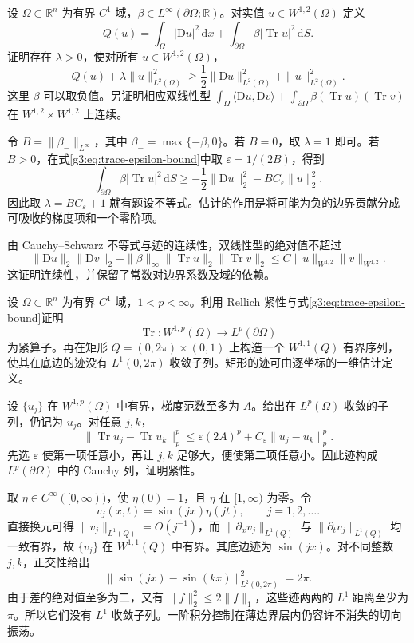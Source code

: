 \begin{exercise}\label{g3:ex:boundary-energy-lower-bound}
	设 \(\Omega\subset\mathbb R^n\) 为有界 \(C^1\) 域，\(\beta\in L^\infty(\partial\Omega;\mathbb R)\)。对实值 \(u\in W^{1,2}(\Omega)\) 定义
	\[
		Q(u)=\int_\Omega|\mathrm Du|^2\,\mathrm dx
		+\int_{\partial\Omega}\beta|\operatorname{Tr}u|^2\,\mathrm dS.
	\]
	证明存在 \(\lambda>0\)，使对所有 \(u\in W^{1,2}(\Omega)\)，
	\[
		Q(u)+\lambda\|u\|_{L^2(\Omega)}^2
		\ge\frac12\|\mathrm Du\|_{L^2(\Omega)}^2
		+\|u\|_{L^2(\Omega)}^2.
	\]
	这里 \(\beta\) 可以取负值。另证明相应双线性型
	\(\int_\Omega\langle\mathrm Du,\mathrm Dv\rangle+\int_{\partial\Omega}\beta(\operatorname{Tr}u)(\operatorname{Tr}v)\)
	在 \(W^{1,2}\times W^{1,2}\) 上连续。
\end{exercise}
\begin{solution}
	令 \(B=\|\beta_-\|_{L^\infty}\)，其中 \(\beta_-=\max\{-\beta,0\}\)。若 \(B=0\)，取 \(\lambda=1\) 即可。若 \(B>0\)，在式\eqref{g3:eq:trace-epsilon-bound}中取 \(\varepsilon=1/(2B)\)，得到
	\[
		\int_{\partial\Omega}\beta|\operatorname{Tr}u|^2\,\mathrm dS
		\ge-\frac12\|\mathrm Du\|_2^2-BC_\varepsilon\|u\|_2^2.
	\]
	因此取 \(\lambda=BC_\varepsilon+1\) 就有题设不等式。估计的作用是将可能为负的边界贡献分成可吸收的梯度项和一个零阶项。

	由 Cauchy--Schwarz 不等式与迹的连续性，双线性型的绝对值不超过
	\[
		\|\mathrm Du\|_2\|\mathrm Dv\|_2
		+\|\beta\|_\infty\|\operatorname{Tr}u\|_2\|\operatorname{Tr}v\|_2
		\le C\|u\|_{W^{1,2}}\|v\|_{W^{1,2}}.
	\]
	这证明连续性，并保留了常数对边界系数及域的依赖。
\end{solution}

\begin{exercise}\label{g3:ex:trace-compactness-endpoint}
	设 \(\Omega\subset\mathbb R^n\) 为有界 \(C^1\) 域，\(1<p<\infty\)。利用 Rellich 紧性与式\eqref{g3:eq:trace-epsilon-bound}证明
	\[
		\operatorname{Tr}:W^{1,p}(\Omega)\longrightarrow L^p(\partial\Omega)
	\]
	为紧算子。再在矩形 \(Q=(0,2\pi)\times(0,1)\) 上构造一个 \(W^{1,1}(Q)\) 有界序列，使其在底边的迹没有 \(L^1(0,2\pi)\) 收敛子列。矩形的迹可由逐坐标的一维估计定义。
\end{exercise}
\begin{solution}
	设 \(\{u_j\}\) 在 \(W^{1,p}(\Omega)\) 中有界，梯度范数至多为 \(A\)。给出在 \(L^p(\Omega)\) 收敛的子列，仍记为 \(u_j\)。对任意 \(j,k\)，
	\[
		\|\operatorname{Tr}u_j-\operatorname{Tr}u_k\|_p^p
		\le\varepsilon(2A)^p+C_\varepsilon\|u_j-u_k\|_p^p.
	\]
	先选 \(\varepsilon\) 使第一项任意小，再让 \(j,k\) 足够大，便使第二项任意小。因此迹构成 \(L^p(\partial\Omega)\) 中的 Cauchy 列，证明紧性。

	取 \(\eta\in C^\infty([0,\infty))\)，使 \(\eta(0)=1\)，且 \(\eta\) 在 \([1,\infty)\) 为零。令
	\[
		v_j(x,t)=\sin(jx)\eta(jt),\qquad j=1,2,\ldots.
	\]
	直接换元可得 \(\|v_j\|_{L^1(Q)}=O(j^{-1})\)，而 \(\|\partial_xv_j\|_{L^1(Q)}\) 与 \(\|\partial_tv_j\|_{L^1(Q)}\) 均一致有界，故 \(\{v_j\}\) 在 \(W^{1,1}(Q)\) 中有界。其底边迹为 \(\sin(jx)\)。对不同整数 \(j,k\)，正交性给出
	\[
		\|\sin(jx)-\sin(kx)\|_{L^2(0,2\pi)}^2=2\pi.
	\]
	由于差的绝对值至多为二，又有 \(\|f\|_2^2\le2\|f\|_1\)，这些迹两两的 \(L^1\) 距离至少为 \(\pi\)。所以它们没有 \(L^1\) 收敛子列。一阶积分控制在薄边界层内仍容许不消失的切向振荡。
\end{solution}
